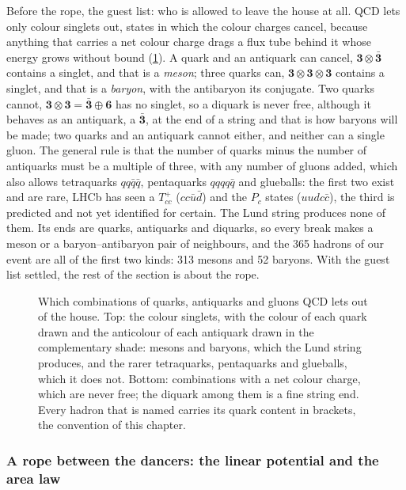 Before the rope, the guest list: who is allowed to leave the house at all.
QCD lets only colour singlets out, states in which the colour charges
cancel, because anything that carries a net colour charge drags a flux
tube behind it whose energy grows without bound
(\cref{fig:children_getting_married:singlets_sketch}). A quark and an
antiquark can cancel, $\mathbf3\otimes\bar{\mathbf3}$ contains a singlet,
and that is a \emph{meson}; three quarks can, $\mathbf3\otimes\mathbf3\otimes\mathbf3$
contains a singlet, and that is a \emph{baryon}, with the antibaryon its
conjugate. Two quarks cannot, $\mathbf3\otimes\mathbf3=\bar{\mathbf3}\oplus\mathbf6$
has no singlet, so a diquark is never free, although it behaves as an
antiquark, a $\bar{\mathbf3}$, at the end of a string and that is how
baryons will be made; two quarks and an antiquark cannot either, and
neither can a single gluon. The general rule is that the number of quarks
minus the number of antiquarks must be a multiple of three, with any
number of gluons added, which also allows tetraquarks $qq\bar q\bar q$,
pentaquarks $qqqq\bar q$ and glueballs: the first two exist and are rare,
LHCb has seen a $T_{cc}^+$ ($cc\bar u\bar d$) and the $P_c$ states
($uudc\bar c$), the third is predicted and not yet identified for certain.
The Lund string produces none of them. Its ends are quarks, antiquarks and
diquarks, so every break makes a meson or a baryon--antibaryon pair of
neighbours, and the 365 hadrons of our event are all of the first two
kinds: 313 mesons and 52 baryons. With the guest list settled, the rest of
the section is about the rope.

\begin{figure}[htbp]\centering
\resizebox{\textwidth}{!}{}
\caption[Which combinations of quarks and antiquarks QCD lets out]{Which
combinations of quarks, antiquarks and gluons QCD lets out of the house.
Top: the colour singlets, with the colour of each quark drawn and the
anticolour of each antiquark drawn in the complementary shade: mesons and
baryons, which the Lund string produces, and the rarer tetraquarks,
pentaquarks and glueballs, which it does not. Bottom: combinations with a
net colour charge, which are never free; the diquark among them is a fine
string end. Every hadron that is named carries its quark content in
brackets, the convention of this chapter.}
\label{fig:children_getting_married:singlets_sketch}
\end{figure}

\subsubsection{A rope between the dancers: the linear potential and the area law}
\label{sec:children_getting_married:string}


